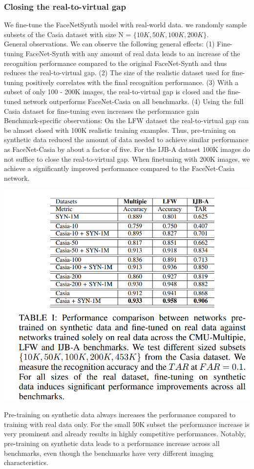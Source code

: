 \documentclass[12pt]{article}
\begin{document}
\subsubsection{Closing the real-to-virtual gap}
We fine-tune the FaceNetSynth model with real-world data. we randomly sample subsets of
the Casia dataset with size N = $\{10K, 50K, 100K, 200K\}$.\\
General observations. We can observe the following general effects: (1) Fine-tuning FaceNet-Synth with any amount of
real data leads to an increase of the recognition performance
compared to the original FaceNet-Synth and thus reduces the
real-to-virtual gap. (2) The size of the realistic dataset used
for fine-tuning positively correlates with the final recognition
performance. (3) With a subset of only 100 - 200K images,
the real-to-virtual gap is closed and the fine-tuned network outperforms FaceNet-Casia on all benchmarks. (4) Using the full
Casia dataset for fine-tuning even increases the performance
gain\\
Benchmark-specific observations: On the LFW dataset the real-to-virtual gap can be almost closed with
100K realistic training examples. Thus, pre-training on synthetic data reduced the amount of data needed to achieve
similar performance as FaceNet-Casia by about a factor of
five. For the IJB-A dataset  100K images do not suffice
to close the real-to-virtual gap. When finetuning with 200K images, we achieve a significantly improved
performance compared to the FaceNet-Casia network.
\begin{center}
  \includegraphics[scale = 1]{img10.png}
\end{center}
Pre-training on synthetic data always increases the performance compared to training with real data only. For the small
50K subset the performance increase is very prominent and
already results in highly competitive performances. Notably,
pre-training on synthetic data leads to a performance increase
across all benchmarks, even though the benchmarks have very
different imaging characteristics.
\end{document}
